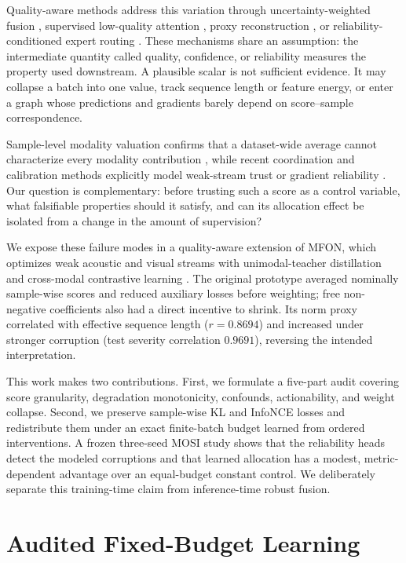 \documentclass{article}
\begin{document}
Quality-aware methods address this variation through uncertainty-weighted fusion \cite{zhang2023qmf,cao2024pdf}, supervised low-quality attention \cite{mai2025samlml}, proxy reconstruction \cite{yuan2021transformer,zhu2025prmf}, or reliability-conditioned expert routing \cite{zhu2026qamoe}. These mechanisms share an assumption: the intermediate quantity called quality, confidence, or reliability measures the property used downstream. A plausible scalar is not sufficient evidence. It may collapse a batch into one value, track sequence length or feature energy, or enter a graph whose predictions and gradients barely depend on score--sample correspondence.

Sample-level modality valuation confirms that a dataset-wide average cannot characterize every modality contribution \cite{wei2024smv}, while recent coordination and calibration methods explicitly model weak-stream trust or gradient reliability \cite{he2026ebmc,jiang2026cpsc}. Our question is complementary: before trusting such a score as a control variable, what falsifiable properties should it satisfy, and can its allocation effect be isolated from a change in the amount of supervision?

We expose these failure modes in a quality-aware extension of MFON, which optimizes weak acoustic and visual streams with unimodal-teacher distillation and cross-modal contrastive learning \cite{zhang2025mfon}. The original prototype averaged nominally sample-wise scores and reduced auxiliary losses before weighting; free non-negative coefficients also had a direct incentive to shrink. Its norm proxy correlated with effective sequence length ($r=0.8694$) and increased under stronger corruption (test severity correlation $0.9691$), reversing the intended interpretation.

This work makes two contributions. First, we formulate a five-part audit covering score granularity, degradation monotonicity, confounds, actionability, and weight collapse. Second, we preserve sample-wise KL and InfoNCE losses and redistribute them under an exact finite-batch budget learned from ordered interventions. A frozen three-seed MOSI study shows that the reliability heads detect the modeled corruptions and that learned allocation has a modest, metric-dependent advantage over an equal-budget constant control. We deliberately separate this training-time claim from inference-time robust fusion.

\section{Audited Fixed-Budget Learning}
\label{sec:method}
\end{document}
